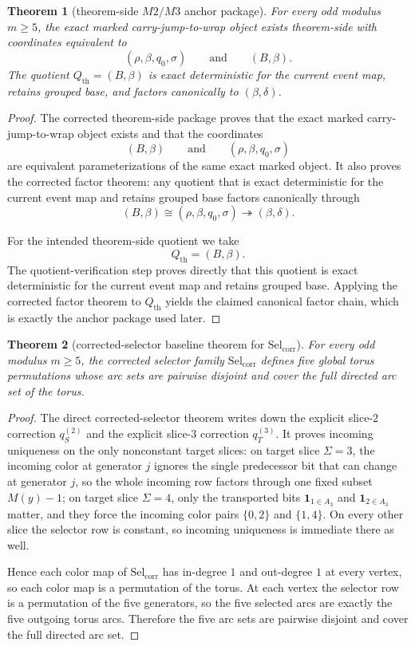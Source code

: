 \documentclass[11pt]{article}
\newtheorem{theorem}{Theorem}[section]
\newcommand{\SelCorr}{\mathrm{Sel}_{\mathrm{corr}}}
\begin{document}
\begin{theorem}[theorem-side $M2/M3$ anchor package]
\label{thm:M23}
For every odd modulus $m\ge 5$, the exact marked carry-jump-to-wrap object
exists theorem-side with coordinates equivalent to
\[
(\rho,\beta,q_0,\sigma)
\qquad\text{and}\qquad
(B,\beta).
\]
The quotient \(Q_{\mathrm{th}}=(B,\beta)\) is exact deterministic for the
current event map, retains grouped base, and factors canonically to
\((\beta,\delta)\).
\end{theorem}

\begin{proof}
The corrected theorem-side package proves that the exact marked
carry-jump-to-wrap object exists and that the coordinates
\[
(B,\beta)
\qquad\text{and}\qquad
(\rho,\beta,q_0,\sigma)
\]
are equivalent parameterizations of the same exact marked object.
It also proves the corrected factor theorem: any quotient that is exact
deterministic for the current event map and retains grouped base factors
canonically through
\[
(B,\beta)\cong(\rho,\beta,q_0,\sigma)\twoheadrightarrow(\beta,\delta).
\]

For the intended theorem-side quotient we take
\[
Q_{\mathrm{th}}=(B,\beta).
\]
The quotient-verification step proves directly that this quotient is exact
deterministic for the current event map and retains grouped base.
Applying the corrected factor theorem to \(Q_{\mathrm{th}}\) yields the claimed
canonical factor chain, which is exactly the anchor package used later.
\end{proof}

\begin{theorem}[corrected-selector baseline theorem for $\SelCorr$]
\label{thm:M4-SelCorr}
For every odd modulus $m\ge 5$, the corrected selector family $\SelCorr$
defines five global torus permutations whose arc sets are pairwise disjoint and
cover the full directed arc set of the torus.
\end{theorem}

\begin{proof}
The direct corrected-selector theorem writes down the explicit slice-\(2\)
correction \(q^{(2)}_S\) and the explicit slice-\(3\) correction \(q^{(3)}_T\).
It proves incoming uniqueness on the only nonconstant target slices:
on target slice \(\Sigma=3\), the incoming color at generator \(j\) ignores the
single predecessor bit that can change at generator \(j\), so the whole
incoming row factors through one fixed subset \(M(y)-1\);
on target slice \(\Sigma=4\), only the transported bits
\(\mathbf 1_{1\in A_3}\) and \(\mathbf 1_{2\in A_3}\) matter, and they force the
incoming color pairs \(\{0,2\}\) and \(\{1,4\}\).
On every other slice the selector row is constant, so incoming uniqueness is
immediate there as well.

Hence each color map of \(\SelCorr\) has in-degree \(1\) and out-degree \(1\) at
every vertex, so each color map is a permutation of the torus.
At each vertex the selector row is a permutation of the five generators, so the
five selected arcs are exactly the five outgoing torus arcs.
Therefore the five arc sets are pairwise disjoint and cover the full directed
arc set.
\end{proof}
\end{document}
